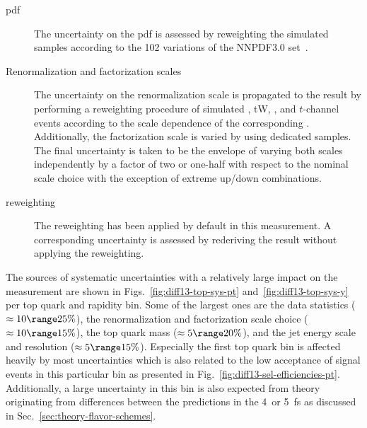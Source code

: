 \begin{description}
\item[\Acrlong{pdf}] The uncertainty on the \gls{pdf} is assessed by reweighting the simulated samples according to the 102 variations of the NNPDF3.0 set~\cite{Ball:2014uwa}.

\item[Renormalization and factorization scales] The uncertainty on the renormalization scale is propagated to the result by performing a reweighting procedure of simulated \ttbar, tW, \wjets, and $t$-channel events according to the scale dependence of the corresponding . Additionally, the factorization scale is varied by using dedicated samples. The final uncertainty is taken to be the envelope of varying both scales independently by a factor of two or one-half with respect to the nominal scale choice with the exception of extreme up/down combinations.

\item[\ttbar \pt reweighting] The \ttbar reweighting has been applied by default in this measurement. A corresponding uncertainty is assessed by rederiving the result without applying the reweighting.
\end{description}

The sources of systematic uncertainties with a relatively large impact on the measurement are shown in Figs.~\ref{fig:diff13-top-sys-pt} and~\ref{fig:diff13-top-sys-y} per top quark \pt and rapidity bin. Some of the largest ones are the data statistics ($\approx10\range25\%$), the renormalization and factorization scale choice ($\approx10\range15\%$), the top quark mass ($\approx5\range20\%$), and the jet energy scale and resolution ($\approx5\range15\%$). Especially the first top quark \pt bin is affected heavily by most uncertainties which is also related to the low acceptance of signal events in this particular bin as presented in Fig.~\ref{fig:diff13-sel-efficiencies-pt}. Additionally, a large uncertainty in this bin is also expected from theory originating from differences between the predictions in the 4~or 5~\gls{fs} as discussed in Sec.~\ref{sec:theory-flavor-schemes}.


